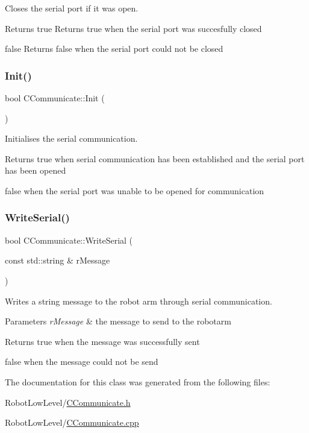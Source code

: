 Closes the serial port if it was open. 

\begin{DoxyReturn}{Returns}
true Returns true when the serial port was succesfully closed 

false Returns false when the serial port could not be closed 
\end{DoxyReturn}
\mbox{\label{classCCommunicate_ab410d966213135d9d5c9ede493c5c5d8}} 
\subsubsection{\texorpdfstring{Init()}{Init()}}
{\footnotesize\ttfamily bool C\+Communicate\+::\+Init (\begin{DoxyParamCaption}{ }\end{DoxyParamCaption})}



Initialises the serial communication. 

\begin{DoxyReturn}{Returns}
true when serial communication has been established and the serial port has been opened 

false when the serial port was unable to be opened for communication 
\end{DoxyReturn}
\mbox{\label{classCCommunicate_a322f1dc7ffdd18be70e6e6aa9eca3613}} 
\subsubsection{\texorpdfstring{Write\+Serial()}{WriteSerial()}}
{\footnotesize\ttfamily bool C\+Communicate\+::\+Write\+Serial (\begin{DoxyParamCaption}\item[{const std\+::string \&}]{r\+Message }\end{DoxyParamCaption})}



Writes a string message to the robot arm through serial communication. 


\begin{DoxyParams}{Parameters}
{\em r\+Message} & the message to send to the robotarm \\
\hline
\end{DoxyParams}
\begin{DoxyReturn}{Returns}
true when the message was successfully sent 

false when the message could not be send 
\end{DoxyReturn}


The documentation for this class was generated from the following files\+:\begin{DoxyCompactItemize}
\item 
Robot\+Low\+Level/\hyperlink{CCommunicate_8h}{C\+Communicate.\+h}\item 
Robot\+Low\+Level/\hyperlink{CCommunicate_8cpp}{C\+Communicate.\+cpp}\end{DoxyCompactItemize}
